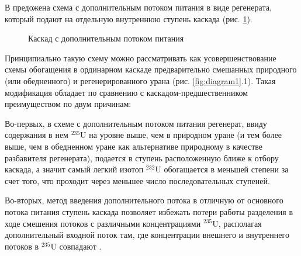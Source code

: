 В \cite{sulaberidzeQuasiidealCascadesAdditional2006} предожена схема с дополнительным потоком питания в виде регенерата, который подают на отдельную внутреннюю ступень каскада (рис. \ref{fig:2_inputs}).
\begin{figure}[ht]
  \caption{Каскад с дополнительным потоком питания}\label{fig:2_inputs}
\end{figure}

Принципиально такую схему можно рассматривать как усовершенствование схемы обогащения в ординарном каскаде предварительно смешанных природного (или обедненного) и регенерированного урана (рис. \ref{fig:diagram1}.1). Такая модификация обладает по сравнению с каскадом-предшественником преимуществом по двум причинам:

Во-первых, в схеме с дополнительным потоком питания регенерат, ввиду содержания в нем $^{235}$U на уровне выше, чем в природном уране (и тем более выше, чем в обедненном уране как альтернативе природному в качестве разбавителя регенерата), подается в ступень расположенную ближе к отбору каскада, а значит самый легкий изотоп $^{232}$U обогащается в меньшей степени за счет того, что проходит через меньшее число последовательных ступеней.

Во-вторых, метод введения дополнительного потока в отличную от основного потока питания ступень каскада позволяет избежать потери работы разделения в ходе смешения потоков с различными концентрациями $^{235}$U, располагая дополнительный входной поток там, где концентрации внешнего и внутреннего потоков в $^{235}$U совпадают \cite{smirnovKaskadnyeShemyZadachah2012, sulaberidzeQuasiidealCascadesAdditional2006}.


